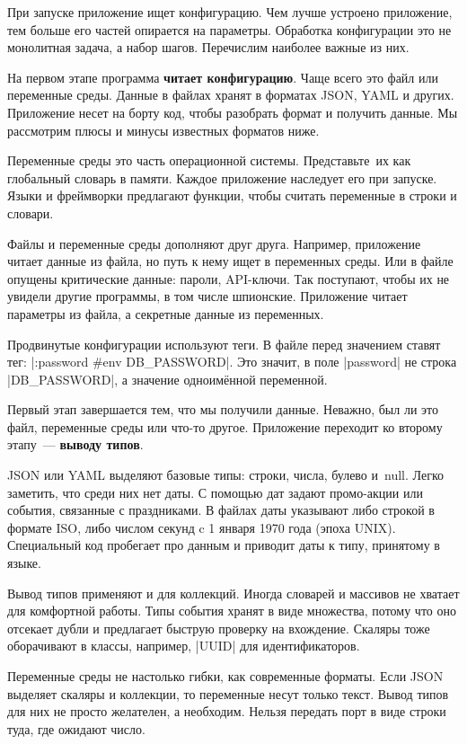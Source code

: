 При запуске приложение ищет конфигурацию. Чем лучше устроено приложение, тем
больше его частей опирается на параметры. Обработка конфигурации это не
монолитная задача, а набор шагов. Перечислим наиболее важные из них.

На первом этапе программа \textbf{читает конфигурацию}. Чаще всего это файл или
переменные среды. Данные в файлах хранят в форматах JSON, YAML и
других. Приложение несет на борту код, чтобы разобрать формат и получить
данные. Мы рассмотрим плюсы и минусы известных форматов ниже.

Переменные среды это часть операционной системы. Представьте~их как глобальный
словарь в памяти. Каждое приложение наследует его при запуске. Языки и
фреймворки предлагают функции, чтобы считать переменные в строки и словари.

Файлы и переменные среды дополняют друг друга. Например, приложение читает
данные из файла, но путь к нему ищет в переменных среды. Или в файле опущены
критические данные: пароли, API-ключи. Так поступают, чтобы их не увидели другие
программы, в том числе шпионские. Приложение читает параметры из файла, а
секретные данные из переменных.

Продвинутые конфигурации используют теги. В файле перед значением
ставят тег: \spverb|:password #env DB_PASSWORD|. Это значит, в поле
\spverb|password| не строка \spverb|DB_PASSWORD|, а значение одноим\"{е}нной
переменной.

Первый этап завершается тем, что мы получили данные. Неважно, был ли это файл,
переменные среды или что-то другое. Приложение переходит ко второму этапу~---
\textbf{выводу типов}.

JSON или YAML выделяют базовые типы: строки, числа, булево и~null. Легко
заметить, что среди них нет даты. С помощью дат задают промо-акции или события,
связанные с праздниками. В файлах даты указывают либо строкой в формате ISO,
либо числом секунд c 1 января 1970 года (эпоха UNIX). Специальный код пробегает
про данным и приводит даты к типу, принятому в языке.

Вывод типов применяют и для коллекций. Иногда словарей и массивов не хватает для
комфортной работы. Типы события хранят в виде множества, потому что оно отсекает
дубли и предлагает быструю проверку на вхождение. Скаляры тоже оборачивают в
классы, например, \spverb|UUID| для идентификаторов.

Переменные среды не настолько гибки, как современные форматы. Если JSON выделяет
скаляры и коллекции, то переменные несут только текст. Вывод типов для них не
просто желателен, а необходим. Нельзя передать порт в виде строки туда, где
ожидают число.

